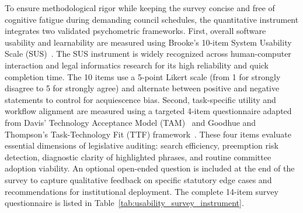    To ensure methodological rigor while keeping the survey concise and free of cognitive fatigue during demanding council schedules, the quantitative instrument integrates two validated psychometric frameworks. First, overall software usability and learnability are measured using Brooke's 10-item System Usability Scale (SUS)~\cite{brooke1996sus}. The SUS instrument is widely recognized across human-computer interaction and legal informatics research for its high reliability and quick completion time. The 10 items use a 5-point Likert scale (from 1 for strongly disagree to 5 for strongly agree) and alternate between positive and negative statements to control for acquiescence bias. Second, task-specific utility and workflow alignment are measured using a targeted 4-item questionnaire adapted from Davis' Technology Acceptance Model (TAM)~\cite{davis1989perceived} and Goodhue and Thompson's Task-Technology Fit (TTF) framework~\cite{goodhue1995task}. These four items evaluate essential dimensions of legislative auditing: search efficiency, preemption risk detection, diagnostic clarity of highlighted phrases, and routine committee adoption viability. An optional open-ended question is included at the end of the survey to capture qualitative feedback on specific statutory edge cases and recommendations for institutional deployment. The complete 14-item survey questionnaire is listed in Table~\ref{tab:usability_survey_instrument}.

